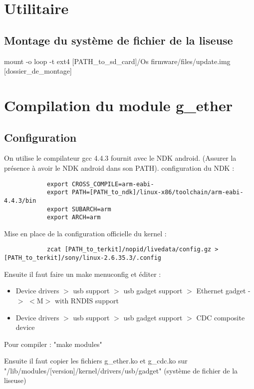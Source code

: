 \section {Utilitaire}
\subsection{Montage du système de fichier de la liseuse}
	mount -o loop -t ext4 [PATH_to_sd_card]/Os firmware/files/update.img  [dossier_de_montage]


\section{Compilation du module g_ether}
	\subsection{Configuration}
		On utilise le compilateur gcc 4.4.3 fournit avec le NDK android.
		(Assurer la présence à avoir le NDK android dans son PATH).
		configuration du NDK : 
		\begin{verbatim}
			export CROSS_COMPILE=arm-eabi-
			export PATH=[PATH_to_ndk]/linux-x86/toolchain/arm-eabi-4.4.3/bin
			export SUBARCH=arm
			export ARCH=arm
		\end{verbatim}
		Mise en place de la configuration officielle du kernel : 
		\begin{verbatim}
			zcat [PATH_to_terkit]/nopid/livedata/config.gz >[PATH_to_terkit]/sony/linux-2.6.35.3/.config
		\end{verbatim}
		Ensuite il faut faire un make menuconfig et éditer  : 
			\begin{itemize}
				\item  Device drivers $>$ usb support $>$ usb gadget support $>$ Ethernet gadget -$>$ $<$M$>$ with RNDIS support
				\item Device drivers $>$ usb support $>$ usb gadget support $>$ CDC composite device
			\end{itemize}

Pour compiler : "make modules"
		
		Ensuite il faut copier les fichiers g_ether.ko et g_cdc.ko sur "/lib/modules/[version]/kernel/drivers/usb/gadget" (système de fichier de la liseuse)
	
